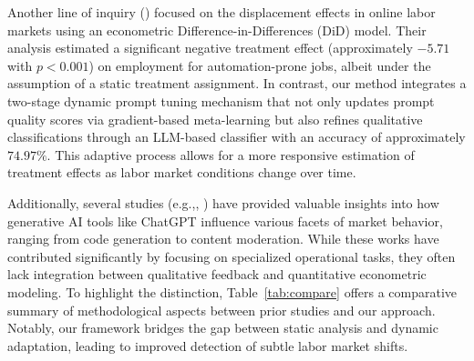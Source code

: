 \documentclass{article} %
\begin{document}
Another line of inquiry (\cite{liu2023generate}) focused on the displacement effects in online labor markets using an econometric Difference-in-Differences (DiD) model. Their analysis estimated a significant negative treatment effect (approximately \(-5.71\) with \(p < 0.001\)) on employment for automation-prone jobs, albeit under the assumption of a static treatment assignment. In contrast, our method integrates a two-stage dynamic prompt tuning mechanism that not only updates prompt quality scores via gradient-based meta-learning but also refines qualitative classifications through an LLM-based classifier with an accuracy of approximately \(74.97\%\). This adaptive process allows for a more responsive estimation of treatment effects as labor market conditions change over time.

Additionally, several studies (e.g.,\cite{ogenrwot2025patchtrackcomprehensiveanalysischatgpts}, \cite{Li_2024}) have provided valuable insights into how generative AI tools like ChatGPT influence various facets of market behavior, ranging from code generation to content moderation. While these works have contributed significantly by focusing on specialized operational tasks, they often lack integration between qualitative feedback and quantitative econometric modeling. To highlight the distinction, Table~\ref{tab:compare} offers a comparative summary of methodological aspects between prior studies and our approach. Notably, our framework bridges the gap between static analysis and dynamic adaptation, leading to improved detection of subtle labor market shifts.

\begin{table}[h]
\centering
{}
\caption{Comparison of key methodological aspects between prior studies and the present work.}
\label{tab:compare}
\end{table}
\end{document}
